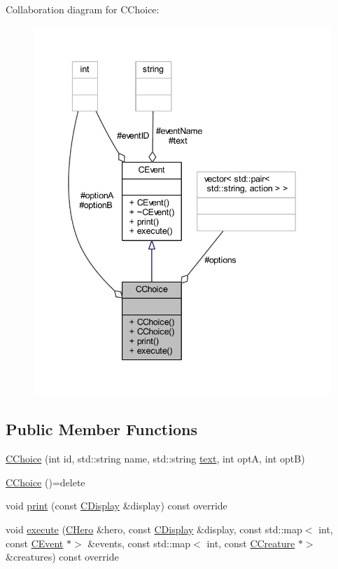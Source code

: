 Collaboration diagram for C\+Choice\+:\nopagebreak
\begin{figure}[H]
\begin{center}
\leavevmode
\includegraphics[width=342pt]{class_c_choice__coll__graph}
\end{center}
\end{figure}
\subsection*{Public Member Functions}
\begin{DoxyCompactItemize}
\item 
\mbox{\hyperlink{class_c_choice_a41af6b55945769cf785d9de68fe43d6b}{C\+Choice}} (int id, std\+::string name, std\+::string \mbox{\hyperlink{class_c_event_a0126916c81d39bf5a4bcd18da90b7c61}{text}}, int optA, int optB)
\item 
\mbox{\hyperlink{class_c_choice_a5fd22c387feda4d5e050b9e0ce2bf22c}{C\+Choice}} ()=delete
\item 
void \mbox{\hyperlink{class_c_choice_a5280ff7c539ed8c8a4007ac38822d9b9}{print}} (const \mbox{\hyperlink{class_c_display}{C\+Display}} \&display) const override
\item 
void \mbox{\hyperlink{class_c_choice_aeccaa71a8fcd358215fe0ddbc37ab143}{execute}} (\mbox{\hyperlink{class_c_hero}{C\+Hero}} \&hero, const \mbox{\hyperlink{class_c_display}{C\+Display}} \&display, const std\+::map$<$ int, const \mbox{\hyperlink{class_c_event}{C\+Event}} $\ast$$>$ \&events, const std\+::map$<$ int, const \mbox{\hyperlink{class_c_creature}{C\+Creature}} $\ast$$>$ \&creatures) const override
\end{DoxyCompactItemize}
